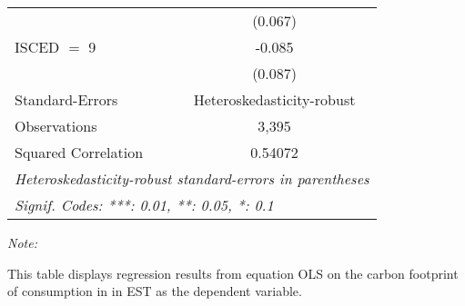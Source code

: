 \begin{table}[htbp!]
\begin{adjustbox}{width = 1\textwidth, max height = 0.95\textheight, center}
\begin{threeparttable}[b]
\begin{tabular}{lc}
                                & (0.067)\\   
            ISCED $=$ 9         & -0.085\\   
                                & (0.087)\\   
            \midrule 
            Standard-Errors     & Heteroskedasticity-robust \\   
            Observations        & 3,395\\  
            Squared Correlation & 0.54072\\  
            \midrule \midrule
            \multicolumn{2}{l}{\emph{Heteroskedasticity-robust standard-errors in parentheses}}\\
            \multicolumn{2}{l}{\emph{Signif. Codes: ***: 0.01, **: 0.05, *: 0.1}}\\
         \end{tabular}
         
         \begin{tablenotes}\item \medskip \textit{Note:}
            \item This table displays regression results from equation OLS on the carbon footprint of consumption in  in EST as the dependent variable.  
         \end{tablenotes}
      \end{threeparttable}
   \end{adjustbox}
\end{table}


